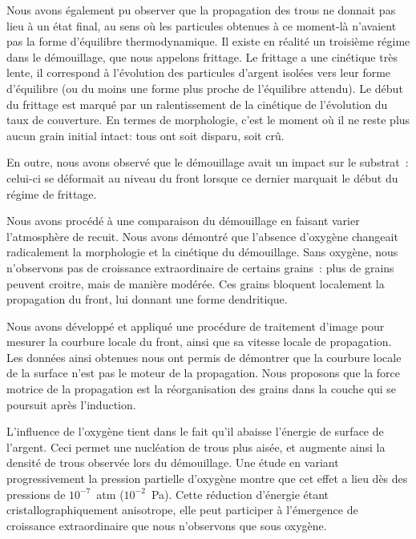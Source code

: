 Nous avons également pu observer que la propagation des trous ne donnait pas lieu à un état final, au sens où les particules obtenues à ce moment-là n'avaient pas la forme d'équilibre thermodynamique. Il existe en réalité un troisième régime dans le démouillage, que nous appelons frittage. Le frittage a une cinétique très lente, il correspond à l'évolution des particules d'argent isolées vers leur forme d'équilibre (ou du moins une forme plus proche de l'équilibre attendu). Le début du frittage est marqué par un ralentissement de la cinétique de l'évolution du taux de couverture. En termes de morphologie, c'est le moment où il ne reste plus aucun grain initial \og intact\fg{}: tous ont soit disparu, soit crû. \par 
En outre, nous avons observé que le démouillage avait un impact sur le substrat~: celui-ci se déformait au niveau du front lorsque ce dernier marquait le début du régime de frittage.\par \vspace{12pt}
Nous avons procédé à une comparaison du démouillage en faisant varier l'atmosphère de recuit. Nous avons démontré que l'absence d'oxygène changeait radicalement la morphologie et la cinétique du démouillage. Sans oxygène, nous n'observons pas de croissance extraordinaire de certains grains~: plus de grains peuvent croitre, mais de manière modérée. Ces grains bloquent localement la propagation du front, lui donnant une forme dendritique.\par 
Nous avons développé et appliqué une procédure de traitement d'image pour mesurer la courbure locale du front, ainsi que sa vitesse locale de propagation. Les données ainsi obtenues nous ont permis de démontrer que la courbure locale de la surface n'est pas le moteur de la propagation. Nous proposons que la force motrice de la propagation est la réorganisation des grains dans la couche qui se poursuit après l'induction.\par 
L'influence de l'oxygène tient dans le fait qu'il abaisse l'énergie de surface de l'argent. Ceci permet une nucléation de trous plus aisée, et augmente ainsi la densité de trous observée lors du démouillage. Une étude en variant progressivement la pression partielle d'oxygène montre que cet effet a lieu dès des pressions de $10^{-7}$~atm ($10^{-2}$~Pa). Cette réduction d'énergie étant cristallographiquement anisotrope, elle peut participer à l'émergence de croissance extraordinaire que nous n'observons que sous oxygène.\par \vspace{12pt}
